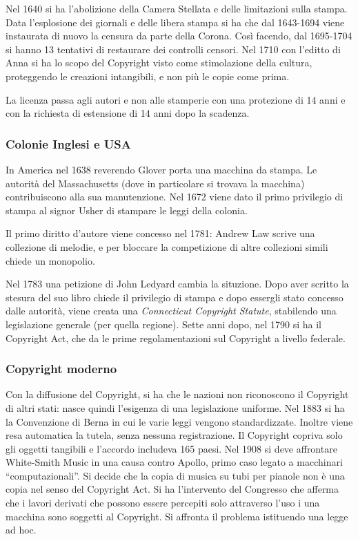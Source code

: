 Nel 1640 si ha l'abolizione della Camera Stellata e delle limitazioni sulla
stampa. Data l'esplosione dei giornali e delle libera stampa si ha che dal
1643-1694 viene instaurata di nuovo la censura da parte della Corona. Cos\`i
facendo, dal 1695-1704 si hanno 13 tentativi di restaurare dei controlli
censori. Nel 1710 con l'editto di Anna si ha lo scopo del Copyright visto come
stimolazione della cultura, proteggendo le creazioni intangibili, e non pi\`u le
copie come prima.

La licenza passa agli autori e non alle stamperie con una protezione di 14 anni e con la richiesta di estensione di 14 anni dopo la scadenza.

\subsubsection{Colonie Inglesi e USA}

In America nel 1638 reverendo Glover porta una macchina da stampa. Le autorit\`a del Massachusetts (dove in particolare si trovava la macchina) contribuiscono alla sua manutenzione. Nel 1672 viene dato il primo privilegio di stampa al signor Usher di stampare le leggi della colonia.


Il primo diritto d'autore viene concesso nel 1781: Andrew Law scrive una collezione di melodie, e per bloccare la competizione di altre collezioni simili chiede un monopolio.

Nel 1783 una petizione di John Ledyard cambia la situzione. Dopo aver scritto la
stesura del suo libro chiede il privilegio di stampa e dopo essergli stato concesso dalle
autorit\`a, viene creata una \textit{Connecticut Copyright Statute}, stabilendo
una legislazione generale (per quella regione). Sette anni dopo, nel 1790 si ha
il Copyright Act, che da le prime regolamentazioni sul Copyright a livello federale.


\subsubsection{Copyright moderno}
Con la diffusione del Copyright, si ha che le nazioni non riconoscono il Copyright di altri stati: nasce quindi l'esigenza di una legislazione uniforme. Nel 1883 si ha la Convenzione di Berna in cui le varie leggi vengono standardizzate. Inoltre viene resa automatica la tutela, senza nessuna registrazione. Il Copyright copriva solo gli oggetti tangibili e l'accordo includeva 165 paesi. Nel 1908 si deve affrontare White-Smith Music in una causa contro Apollo, primo caso legato a macchinari ``computazionali''. Si decide che la copia di musica su tubi per pianole non \`e una copia nel senso del Copyright Act. Si ha l'intervento del Congresso che afferma che i lavori derivati che possono essere percepiti solo attraverso l'uso i una macchina sono soggetti al Copyright. Si affronta il problema istituendo una legge ad hoc.

